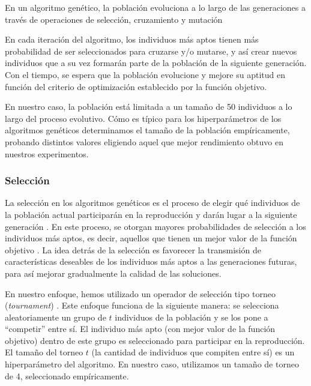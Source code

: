 En un algoritmo genético, la población evoluciona a lo largo de las generaciones a través de operaciones de selección, 
cruzamiento y mutación \cite{Goldberg:1989}

En cada iteración del algoritmo, los individuos más aptos tienen más probabilidad de ser seleccionados para cruzarse y/o mutarse, 
y así crear nuevos individuos que a su vez formarán parte de la población de la siguiente generación. Con el tiempo, se espera que la población evolucione y
mejore su aptitud en función del criterio de optimización establecido por la función objetivo.

En nuestro caso, la población está limitada a un tamaño de 50 individuos a lo largo del proceso evolutivo.
Cómo es típico para los hiperparámetros de los algoritmos genéticos determinamos el tamaño de la población empíricamente, probando distintos valores
eligiendo aquel que mejor rendimiento obtuvo en nuestros experimentos.


\subsubsection{Selección}
\label{sec:selection}
La selección en los algoritmos genéticos es el proceso de elegir qué individuos de la población actual participarán en la reproducción y darán lugar a la siguiente generación \cite{Goldberg:1989}. En este proceso, se otorgan mayores probabilidades de selección a los individuos más aptos, es decir, aquellos que tienen un mejor valor de la función objetivo \cite{Goldberg:1989}.
La idea detrás de la selección es favorecer la transmisión de características deseables de los individuos más aptos a las generaciones futuras, para así mejorar gradualmente la calidad de las soluciones.

En nuestro enfoque, hemos utilizado un operador de selección tipo torneo (\emph{tournament}) \cite{Goldberg:1989}. Este enfoque funciona de la siguiente manera: se selecciona aleatoriamente un grupo de $t$ individuos de la población y se los pone a ``competir'' entre sí. El individuo más apto (con mejor valor de la función objetivo) dentro de este grupo es seleccionado para participar en la reproducción. El tamaño del torneo $t$ (la cantidad de individuos que compiten entre sí) es un hiperparámetro del algoritmo. En nuestro caso, utilizamos un tamaño de torneo de 4, seleccionado empíricamente.

